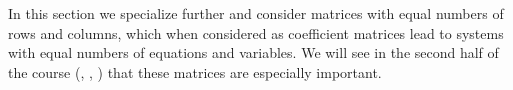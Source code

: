 %
\begin{introduction}
\begin{para}In this section we specialize further and consider matrices with equal numbers of rows and columns, which when considered as coefficient matrices lead to systems with equal numbers of equations and variables.  We will see in the second half of the course (,  , ) that these matrices are especially important.\end{para}
\end{introduction}
%

